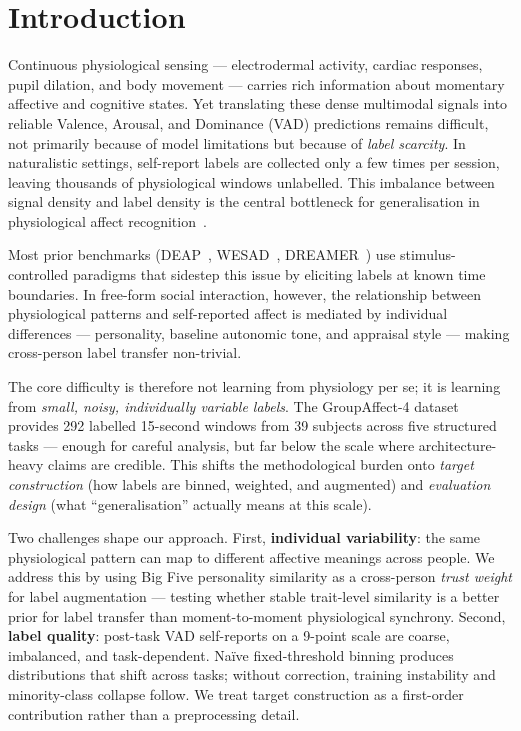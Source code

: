 \documentclass[sigconf,review,anonymous]{acmart}
\begin{document}
\section{Introduction}
\label{sec:intro}

Continuous physiological sensing --- electrodermal activity, cardiac
responses, pupil dilation, and body movement --- carries rich information
about momentary affective and cognitive states.
Yet translating these dense multimodal signals into reliable Valence,
Arousal, and Dominance (VAD) predictions remains difficult,
not primarily because of model limitations but because of
\emph{label scarcity}.
In naturalistic settings, self-report labels are collected only a few times
per session, leaving thousands of physiological windows unlabelled.
This imbalance between signal density and label density is the central
bottleneck for generalisation in physiological affect
recognition~\cite{shu2018review,ahmad2022survey}.

Most prior benchmarks (DEAP~\cite{koelstra2012deap},
WESAD~\cite{schmidt2018wesad}, DREAMER~\cite{katsigiannis2018dreamer})
use stimulus-controlled paradigms that sidestep this issue by eliciting
labels at known time boundaries.
In free-form social interaction, however, the relationship between
physiological patterns and self-reported affect is mediated by individual
differences --- personality, baseline autonomic tone, and appraisal
style --- making cross-person label transfer non-trivial.

The core difficulty is therefore not learning from physiology per se;
it is learning from \emph{small, noisy, individually variable labels}.
The GroupAffect-4 dataset~\cite{groupaffect4} provides 292 labelled
15-second windows from 39 subjects across five structured tasks
--- enough for careful analysis, but far below the scale where
architecture-heavy claims are credible.
This shifts the methodological burden onto \emph{target construction}
(how labels are binned, weighted, and augmented) and
\emph{evaluation design} (what ``generalisation'' actually means at
this scale).

Two challenges shape our approach.
First, \textbf{individual variability}: the same physiological pattern
can map to different affective meanings across people.
We address this by using Big Five personality similarity as a
cross-person \emph{trust weight} for label augmentation --- testing
whether stable trait-level similarity is a better prior for label
transfer than moment-to-moment physiological synchrony.
Second, \textbf{label quality}: post-task VAD self-reports on a 9-point
scale are coarse, imbalanced, and task-dependent.
Naïve fixed-threshold binning produces distributions that shift across
tasks; without correction, training instability and minority-class
collapse follow.
We treat target construction as a first-order contribution rather
than a preprocessing detail.
\end{document}
